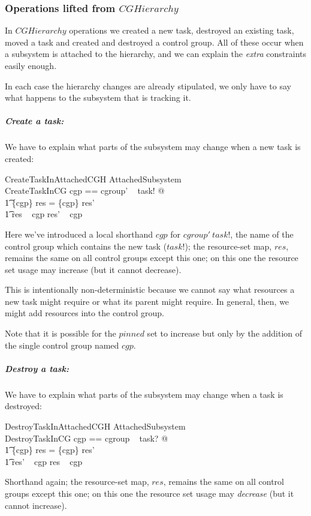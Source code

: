 \documentclass[a4paper,twoside,12pt]{article}
\begin{document}
\subsubsection{Operations lifted from $CGHierarchy$}

In $CGHierarchy$ operations we created a new task, destroyed an existing task, moved a task and created and destroyed
a control group.  All of these occur when a subsystem is attached to the hierarchy, and we can explain the \emph{extra}
constraints easily enough.

In each case the hierarchy changes are already stipulated, we only have to say what happens to the subsystem that is
tracking it.

\subparagraph{Create a task:}
We have to explain what parts of the subsystem may change when a new task is created:

\begin{schema}{CreateTaskInAttachedCGH}
\Delta AttachedSubsystem \\
CreateTaskInCG
\where
\LET cgp == cgroup' ~ task! @ \\
\t1 \{cgp\} \ndres res = \{cgp\} \ndres res' \land \\
\t1 res ~ cgp \subseteq res' ~ cgp
\end{schema}
Here we've introduced a local shorthand $cgp$ for $cgroup' ~ task!$, the name of the control group which contains
the new task ($task!$); the resource-set map, $res$, remains the same on all control groups except this one;
on this one the resource set usage may increase (but it cannot decrease).

This is intentionally non-deterministic because we cannot say what resources a new task might require or
what its parent might require. In general, then, we might add resources into the control group.

Note that it is possible for the $pinned$ set to increase but only by the addition of the single control group
named $cgp$.

\subparagraph{Destroy a task:}
We have to explain what parts of the subsystem may change when a task is destroyed:

\begin{schema}{DestroyTaskInAttachedCGH}
\Delta AttachedSubsystem \\
DestroyTaskInCG
\where
\LET cgp == cgroup ~ task? @ \\
\t1 \{cgp\} \ndres res = \{cgp\} \ndres res' \land \\
\t1 res' ~ cgp \subseteq res ~ cgp
\end{schema}
Shorthand again;  the resource-set map, $res$, remains the same on all control groups except this one;
on this one the resource set usage may \emph{decrease} (but it cannot increase).
\end{document}
